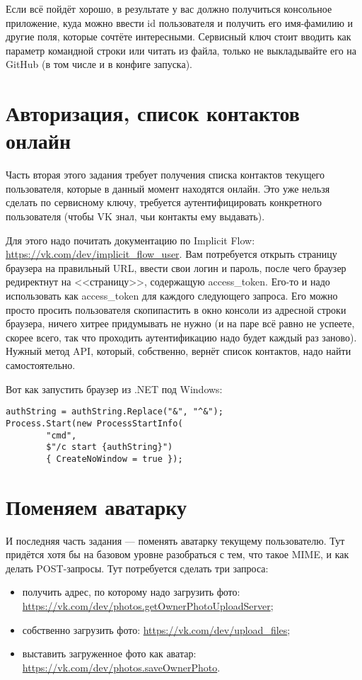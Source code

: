 \documentclass[a5paper]{article}
\begin{document}
Если всё пойдёт хорошо, в результате у вас должно получиться консольное приложение, куда можно ввести id пользователя и получить его имя-фамилию и другие поля, которые сочтёте интересными. Сервисный ключ стоит вводить как параметр командной строки или читать из файла, только не выкладывайте его на GitHub (в том числе и в конфиге запуска).

\section{Авторизация, список контактов онлайн}

Часть вторая этого задания требует получения списка контактов текущего пользователя, которые в данный момент находятся онлайн. Это уже нельзя сделать по сервисному ключу, требуется аутентифицировать конкретного пользователя (чтобы VK знал, чьи контакты ему выдавать). 

Для этого надо почитать документацию по Implicit Flow: \url{https://vk.com/dev/implicit_flow_user}. Вам потребуется открыть страницу браузера на правильный URL, ввести свои логин и пароль, после чего браузер редиректнут на <<страницу>>, содержащую access\_token. Его-то и надо использовать как access\_token для каждого следующего запроса. Его можно просто просить пользователя скопипастить в окно консоли из адресной строки браузера, ничего хитрее придумывать не нужно (и на паре всё равно не успеете, скорее всего, так что проходить аутентификацию надо будет каждый раз заново). Нужный метод API, который, собственно, вернёт список контактов, надо найти самостоятельно.

Вот как запустить браузер из .NET под Windows:

\begin{verbatim}
authString = authString.Replace("&", "^&");
Process.Start(new ProcessStartInfo(
        "cmd", 
        $"/c start {authString}") 
        { CreateNoWindow = true });
\end{verbatim}

\section{Поменяем аватарку}

И последняя часть задания --- поменять аватарку текущему пользователю. Тут придётся хотя бы на базовом уровне разобраться с тем, что такое MIME, и как делать POST-запросы. Тут потребуется сделать три запроса:

\begin{itemize}
    \item получить адрес, по которому надо загрузить фото: \url{https://vk.com/dev/photos.getOwnerPhotoUploadServer};
    \item собственно загрузить фото: \url{https://vk.com/dev/upload_files};
    \item выставить загруженное фото как аватар: \url{https://vk.com/dev/photos.saveOwnerPhoto}.
\end{itemize}
\end{document}
